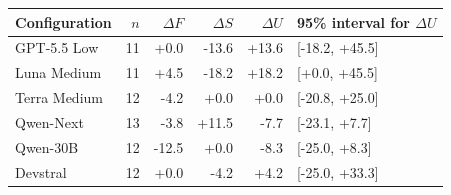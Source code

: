 \begin{tabular}{lrrrrl}
\toprule
Configuration & $n$ & $\Delta F$ & $\Delta S$ & $\Delta U$ & 95\% interval for $\Delta U$\\
\midrule
GPT-5.5 Low & 11 & +0.0 & -13.6 & +13.6 & [-18.2, +45.5]\\
Luna Medium & 11 & +4.5 & -18.2 & +18.2 & [+0.0, +45.5]\\
Terra Medium & 12 & -4.2 & +0.0 & +0.0 & [-20.8, +25.0]\\
Qwen-Next & 13 & -3.8 & +11.5 & -7.7 & [-23.1, +7.7]\\
Qwen-30B & 12 & -12.5 & +0.0 & -8.3 & [-25.0, +8.3]\\
Devstral & 12 & +0.0 & -4.2 & +4.2 & [-25.0, +33.3]\\
\bottomrule
\end{tabular}
